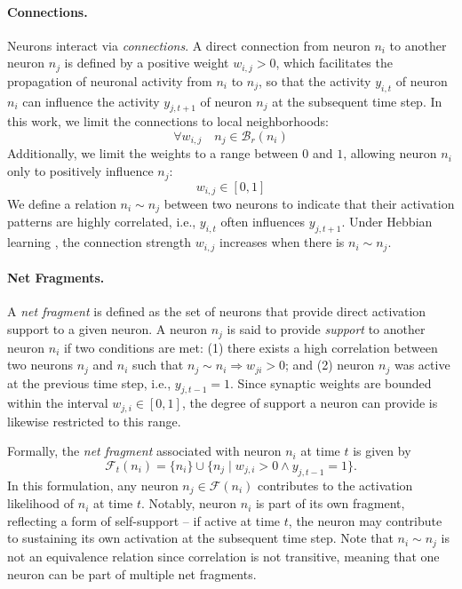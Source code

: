 \documentclass[12pt]{article}
\begin{document}
\paragraph{Connections.}
Neurons interact via \emph{connections}. A direct connection from neuron $n_i$ to another neuron $n_j$ is defined by a positive weight $w_{i,j} > 0$, which facilitates the propagation of neuronal activity from $n_i$ to $n_j$, so that the activity $y_{i,t}$ of neuron $n_i$ can influence the activity $y_{j,t+1}$ of neuron $n_j$ at the subsequent time step. In this work, we limit the connections to local neighborhoods:
%
\begin{equation}
\forall  w_{i,j} \quad n_j \in \mathcal{B}_r(n_i)
\label{eq:neighborhood_connections}
\end{equation}
%
Additionally, we limit the weights to a range between $0$ and $1$, allowing neuron $n_i$ only to positively influence $n_j$:%
\begin{equation}
w_{i,j} \in [0,1]
\label{eq:neighborhood_connections_range}
\end{equation}
%
We define a relation $n_i \sim n_j$ between two neurons to indicate that their activation patterns are highly correlated, i.e., $y_{i,t}$ often influences  $y_{j,t+1}$.
Under Hebbian learning \citep{hebb_organization_1949}, the connection strength $w_{i,j}$ increases when there is $n_i \sim n_j$.


\paragraph{Net Fragments.}
A \emph{net fragment}  is defined as the set of neurons that provide direct activation support to a given neuron.
A neuron $n_j$ is said to provide \emph{support} to another neuron $n_i$ if two conditions are met:
(1) there exists a high correlation between two neurons $n_j$ and $n_i$ such that $n_j \sim n_i \Rightarrow w_{ji} > 0$; and (2) neuron $n_j$ was active at the previous time step, i.e., $y_{j,t-1}=1$.
Since synaptic weights are bounded within the interval $w_{j,i} \in [0,1]$, the degree of support a neuron can provide is likewise restricted to this range.

Formally, the \emph{net fragment} associated with neuron $n_i$ at time $t$ is given by
%
\begin{equation}
  \mathcal{F}_{t}(n_i) = \{n_i\} \cup \{n_j \mid w_{j,i} > 0 \land y_{j,t-1} = 1\}.
  \label{eq:net_fragments}
\end{equation}
%
In this formulation, any neuron $n_j \in \mathcal{F}(n_i)$  contributes to the activation likelihood of $n_i$ at time $t$.
Notably, neuron $n_i$ is part of its own fragment, reflecting a form of self-support -- if active at time $t$, the neuron may contribute to sustaining its own activation at the subsequent time step.
Note that $n_i \sim n_j$ is not an equivalence relation since correlation is not transitive, meaning that one neuron can be part of multiple net fragments.
\end{document}
